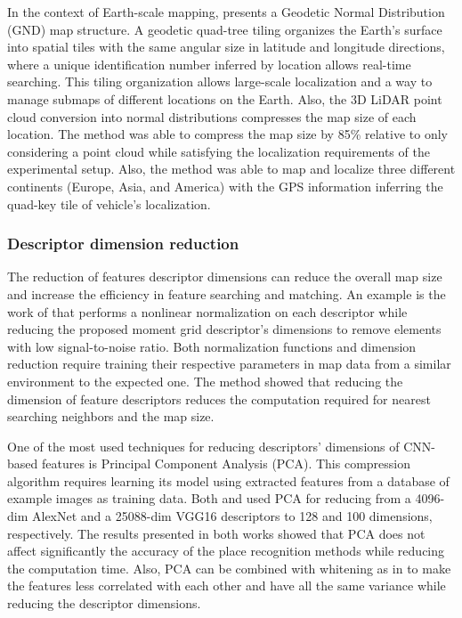 In the context of Earth-scale mapping, \cite{kim-et-al:2021:3047421} presents a Geodetic Normal Distribution (GND) map structure. A geodetic quad-tree tiling organizes the Earth's surface into spatial tiles with the same angular size in latitude and longitude directions, where a unique identification number inferred by location allows real-time searching. This tiling organization allows large-scale localization and a way to manage submaps of different locations on the Earth. Also, the 3D LiDAR point cloud conversion into normal distributions compresses the map size of each location.
The method was able to compress the map size by 85\% relative to only considering a point cloud while satisfying the localization requirements of the experimental setup. Also, the method was able to map and localize three different continents (Europe, Asia, and America) with the GPS information inferring the quad-key tile of vehicle's localization.



\subsubsection{Descriptor dimension reduction}

The reduction of features descriptor dimensions can reduce the overall map size and increase the efficiency in feature searching and matching.
An example is the work of \cite{bosse-zlot:2009:009} that performs a nonlinear normalization on each descriptor while reducing the proposed moment grid descriptor's dimensions to remove elements with low signal-to-noise ratio. Both normalization functions and dimension reduction require training their respective parameters in map data from a similar environment to the expected one. The method showed that reducing the dimension of feature descriptors reduces the computation required for nearest searching neighbors and the map size.

One of the most used techniques for reducing descriptors' dimensions of CNN-based features is Principal Component Analysis (PCA). This compression algorithm requires learning its model using extracted features from a database of example images as training data. Both \cite{taisho-kanji:2016:7866383} and \cite{camara-et-al:2020:9196967} used PCA for reducing from a 4096-dim AlexNet and a 25088-dim VGG16 descriptors to 128 and 100 dimensions, respectively. The results presented in both works showed that PCA does not affect significantly the accuracy of the place recognition methods while reducing the computation time.
Also, PCA can be combined with whitening as in \cite{piasco-et-al:2021:6} to make the features less correlated with each other and have all the same variance while reducing the descriptor dimensions.

